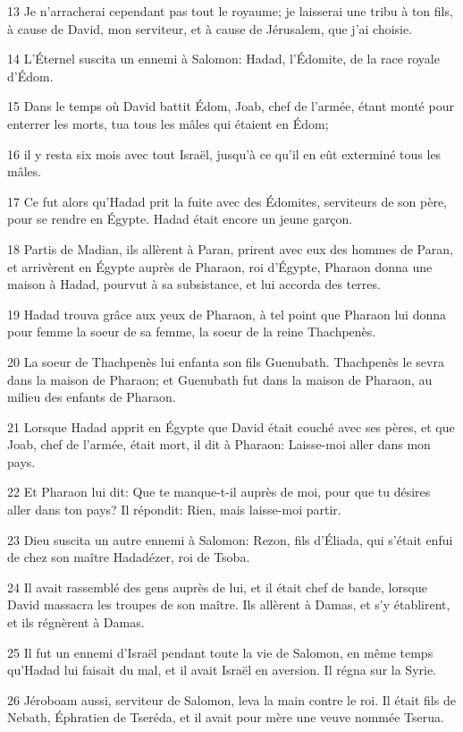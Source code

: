 \par 13 Je n'arracherai cependant pas tout le royaume; je laisserai une tribu à ton fils, à cause de David, mon serviteur, et à cause de Jérusalem, que j'ai choisie.
\par 14 L'Éternel suscita un ennemi à Salomon: Hadad, l'Édomite, de la race royale d'Édom.
\par 15 Dans le temps où David battit Édom, Joab, chef de l'armée, étant monté pour enterrer les morts, tua tous les mâles qui étaient en Édom;
\par 16 il y resta six mois avec tout Israël, jusqu'à ce qu'il en eût exterminé tous les mâles.
\par 17 Ce fut alors qu'Hadad prit la fuite avec des Édomites, serviteurs de son père, pour se rendre en Égypte. Hadad était encore un jeune garçon.
\par 18 Partis de Madian, ils allèrent à Paran, prirent avec eux des hommes de Paran, et arrivèrent en Égypte auprès de Pharaon, roi d'Égypte, Pharaon donna une maison à Hadad, pourvut à sa subsistance, et lui accorda des terres.
\par 19 Hadad trouva grâce aux yeux de Pharaon, à tel point que Pharaon lui donna pour femme la soeur de sa femme, la soeur de la reine Thachpenès.
\par 20 La soeur de Thachpenès lui enfanta son fils Guenubath. Thachpenès le sevra dans la maison de Pharaon; et Guenubath fut dans la maison de Pharaon, au milieu des enfants de Pharaon.
\par 21 Lorsque Hadad apprit en Égypte que David était couché avec ses pères, et que Joab, chef de l'armée, était mort, il dit à Pharaon: Laisse-moi aller dans mon pays.
\par 22 Et Pharaon lui dit: Que te manque-t-il auprès de moi, pour que tu désires aller dans ton pays? Il répondit: Rien, mais laisse-moi partir.
\par 23 Dieu suscita un autre ennemi à Salomon: Rezon, fils d'Éliada, qui s'était enfui de chez son maître Hadadézer, roi de Tsoba.
\par 24 Il avait rassemblé des gens auprès de lui, et il était chef de bande, lorsque David massacra les troupes de son maître. Ils allèrent à Damas, et s'y établirent, et ils régnèrent à Damas.
\par 25 Il fut un ennemi d'Israël pendant toute la vie de Salomon, en même temps qu'Hadad lui faisait du mal, et il avait Israël en aversion. Il régna sur la Syrie.
\par 26 Jéroboam aussi, serviteur de Salomon, leva la main contre le roi. Il était fils de Nebath, Éphratien de Tseréda, et il avait pour mère une veuve nommée Tserua.
